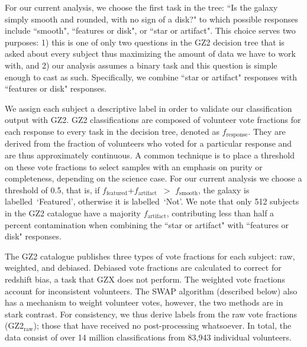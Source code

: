\documentclass[twocolumn,  trackchanges, ]{aastex6}%
\newcommand{\feat}{`Featured'}
\newcommand{\notfeat}{`Not'}
\newcommand{\raw}{GZ2$_{\text{raw}}$}
\newcommand{\ffeat}{$f_{\mathrm{featured}}$}
\newcommand{\fsmooth}{$f_{\mathrm{smooth}}$}
\newcommand{\fstar}{$f_{\mathrm{artifact}}$}
\begin{document}
For our current analysis, we choose the first task in the tree: ``Is the galaxy simply smooth and rounded, with no sign of a disk?" to which possible responses include ``smooth", ``features or disk", or ``star or artifact". This choice serves two purposes: 1) this is one of only two questions in the GZ2 decision tree that is asked about every subject thus maximizing the amount of data we have to work with, and 2) our analysis assumes a binary task and this question is simple enough to cast as such. Specifically, we combine ``star or artifact" responses with ``features or disk" responses.

We assign each subject a descriptive label in order to validate our classification output with GZ2. GZ2 classifications are composed of volunteer vote fractions for each response to every task in the decision tree, denoted as $f_{\mathrm{response}}$. They are derived from the fraction of volunteers who voted for a particular response and are thus approximately continuous. A common technique is to place a threshold on these vote fractions to select samples with an emphasis on purity or completeness, depending on the science case. For our current analysis we choose a threshold of 0.5, that is, if \ffeat+\fstar~$ >$ \fsmooth, the galaxy is labelled~\feat, otherwise it is labelled~\notfeat. We note that only 512 subjects in the GZ2 catalogue have a majority \fstar, contributing less than half a percent contamination when combining the ``star or artifact" with ``features or disk" responses.

The GZ2 catalogue publishes three types of vote fractions for each subject: raw, weighted, and debiased. Debiased vote fractions are calculated to correct for redshift bias, a task that GZX does not perform. The weighted vote fractions account for inconsistent volunteers. The SWAP algorithm (described below) also has a mechanism to weight volunteer votes, however, the two methods are in stark contrast. For consistency, we thus derive labels from the raw vote fractions (\raw); those that have received no post-processing whatsoever. In total, the data consist of over 14 million classifications from 83,943 individual volunteers. 

\end{document}
